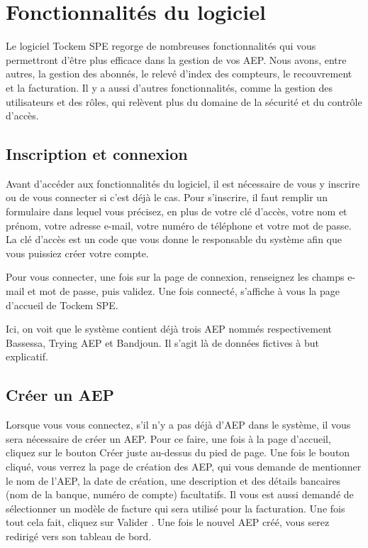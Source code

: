 \chapter{Fonctionnalités du logiciel}

Le logiciel Tockem SPE regorge de nombreuses fonctionnalités qui vous permettront d'être plus efficace dans la gestion de vos AEP. Nous avons, entre autres, la gestion des abonnés, le relevé d'index des compteurs, le recouvrement et la facturation. Il y a aussi d'autres fonctionnalités, comme la gestion des utilisateurs et des rôles, qui relèvent plus du domaine de la sécurité et du contrôle d'accès.

\section{Inscription et connexion}

Avant d'accéder aux fonctionnalités du logiciel, il est nécessaire de vous y inscrire ou de vous connecter si c'est déjà le cas. Pour s'inscrire, il faut remplir un formulaire dans lequel vous précisez, en plus de votre clé d'accès, votre nom et prénom, votre adresse e-mail, votre numéro de téléphone et votre mot de passe. La clé d'accès est un code que vous donne le responsable du système afin que vous puissiez créer votre compte.

Pour vous connecter, une fois sur la page de connexion, renseignez les champs e-mail et mot de passe, puis validez. Une fois connecté, s'affiche à vous la page d'accueil de Tockem SPE.

Ici, on voit que le système contient déjà trois AEP nommés respectivement Bassessa, Trying AEP et Bandjoun. Il s'agit là de données fictives à but explicatif.

\section{Créer un AEP}

Lorsque vous vous connectez, s'il n'y a pas déjà d'AEP dans le système, il vous sera nécessaire de créer un AEP. Pour ce faire, une fois à la page d'accueil, cliquez sur le bouton \og Créer \fg{} juste au-dessus du pied de page. Une fois le bouton cliqué, vous verrez la page de création des AEP, qui vous demande de mentionner le nom de l'AEP, la date de création, une description et des détails bancaires (nom de la banque, numéro de compte) facultatifs. Il vous est aussi demandé de sélectionner un modèle de facture qui sera utilisé pour la facturation. Une fois tout cela fait, cliquez sur \og Valider \fg{}. Une fois le nouvel AEP créé, vous serez redirigé vers son tableau de bord.

